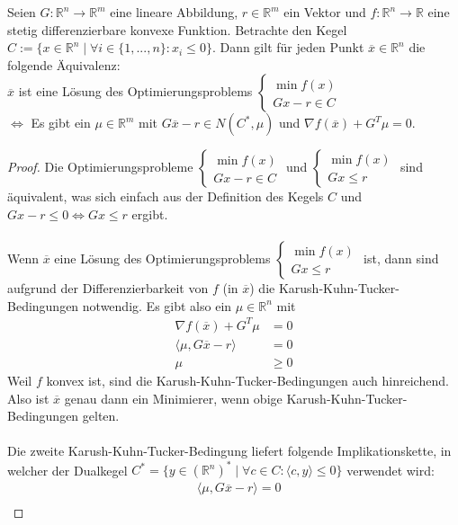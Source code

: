 
Seien $G:\mathbb R^n\to\mathbb R^m$ eine lineare Abbildung, $r\in\mathbb R^m$ ein Vektor und $f: \mathbb R^n\to \mathbb R$ eine stetig differenzierbare konvexe Funktion. Betrachte den Kegel $C:=\{x\in\mathbb R^n\mid\forall  i\in\{1,...,n\}: x_i\leq 0\}$. Dann gilt für jeden Punkt $\overline x\in\mathbb R^n$ die folgende Äquivalenz:\\ $\overline x$ ist eine Lösung des Optimierungsproblems $\begin{cases}\min f(x)\\Gx-r\in C\end{cases}$\\
$\Leftrightarrow$ Es gibt ein $\mu\in\mathbb R^m$ mit $G\overline x-r\in N(C^*,\mu)$ und $\nabla f(\overline x)+G^T\mu=0$.
\begin{proof}
Die Optimierungsprobleme $\begin{cases}\min f(x)\\Gx-r\in C\end{cases}$ und $\begin{cases}\min f(x)\\Gx\leq r\end{cases}$ sind äquivalent, was sich einfach aus der Definition des Kegels $C$ und $Gx-r\leq 0\Leftrightarrow Gx\leq r$ ergibt.\\\\
Wenn $\overline x$ eine Lösung des Optimierungsproblems $\begin{cases}\min f(x)\\Gx\leq r\end{cases}$ ist, dann sind aufgrund der Differenzierbarkeit von $f$ (in $\overline x$) die Karush-Kuhn-Tucker-Bedingungen notwendig. Es gibt also ein $\mu\in\mathbb R^n$ mit
\begin{align*}\nabla f(\overline x)+G^T\mu&=0\\\langle \mu, G\overline x-r \rangle&=0\\\mu&\geq 0\end{align*}
Weil $f$ konvex ist, sind die Karush-Kuhn-Tucker-Bedingungen auch hinreichend. Also ist $\overline x$ genau dann ein Minimierer, wenn obige Karush-Kuhn-Tucker-Bedingungen gelten.\\\\
Die zweite Karush-Kuhn-Tucker-Bedingung liefert folgende Implikationskette, in welcher der Dualkegel $C^*=\{y\in (\mathbb R^n)^*\mid \forall c\in C: \langle c,y\rangle \leq 0\}$ verwendet wird:
\begin{align*}&\langle \mu, G\overline x-r\rangle=0\\

\end{align*}
\end{proof}
